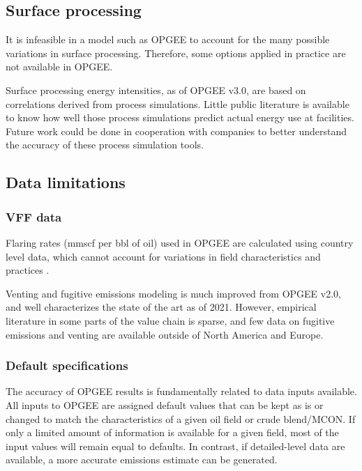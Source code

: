 \documentclass[11pt]{report}
\begin{document}
\subsection{Surface processing}

It is infeasible in a model such as OPGEE to account for the many possible variations in surface processing. Therefore, some options applied in practice are not available in OPGEE.\par

Surface processing energy intensities, as of OPGEE v3.0, are based on correlations derived from process simulations. Little public literature is available to know how well those process simulations predict actual energy use at facilities. Future work could be done in cooperation with companies to better understand the accuracy of these process simulation tools.
\par

\subsection{Data limitations}

\subsubsection{VFF data}

Flaring rates (mmscf per bbl of oil) used in OPGEE are calculated using country level data, which cannot account for variations in field characteristics and practices \cite{NOAA2010,EIA2010}. 

Venting and fugitive emissions modeling is much improved from OPGEE v2.0, and well characterizes the state of the art as of 2021. However, empirical literature in some parts of the value chain is sparse, and few data on fugitive emissions and venting are available outside of North America and Europe.\par

\subsubsection{Default specifications}

The accuracy of OPGEE results is fundamentally related to data inputs available. All inputs to OPGEE are assigned default values that can be kept as is or changed to match the characteristics of a given oil field or crude blend/MCON. If only a limited amount of information is available for a given field, most of the input values will remain equal to defaults. In contrast, if detailed-level data are available, a more accurate emissions estimate can be generated. \par
\end{document}
